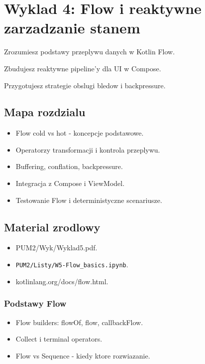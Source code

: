 \chapter{Wyklad 4: Flow i reaktywne zarzadzanie stanem}

\begin{learningobjectives}
  \item Zrozumiesz podstawy przeplywu danych w Kotlin Flow.
  \item Zbudujesz reaktywne pipeline'y dla UI w Compose.
  \item Przygotujesz strategie obslugi bledow i backpressure.
\end{learningobjectives}

\section{Mapa rozdzialu}
\begin{itemize}
  \item Flow cold vs hot - koncepcje podstawowe.
  \item Operatorzy transformacji i kontrola przeplywu.
  \item Buffering, conflation, backpressure.
  \item Integracja z Compose i ViewModel.
  \item Testowanie Flow i deterministyczne scenariusze.
\end{itemize}

\section{Material zrodlowy}
\begin{itemize}
  \item PUM2/Wyk/Wyklad5.pdf.
  \item \texttt{PUM2/Listy/W5-Flow\_basics.ipynb}.
  \item kotlinlang.org/docs/flow.html.
\end{itemize}

\subsection{Podstawy Flow}
\begin{itemize}
  \item Flow builders: flowOf, flow, callbackFlow.
  \item Collect i terminal operators.
  \item Flow vs Sequence - kiedy ktore rozwiazanie.
\end{itemize}

